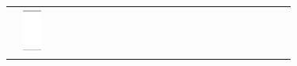 \documentclass[10pt]{article}
\begin{document}
\begin{center}
\begin{tabular}{|c|c|c|c|c|c|c|c|c|c|c|c|c|c|c|c|c|c|c|c|c|c|c|c|}
 & \includegraphics[max width=\textwidth]{2024_11_21_0c267759828927e3a26dg-09}

\end{tabular}
\end{center}
\end{document}
